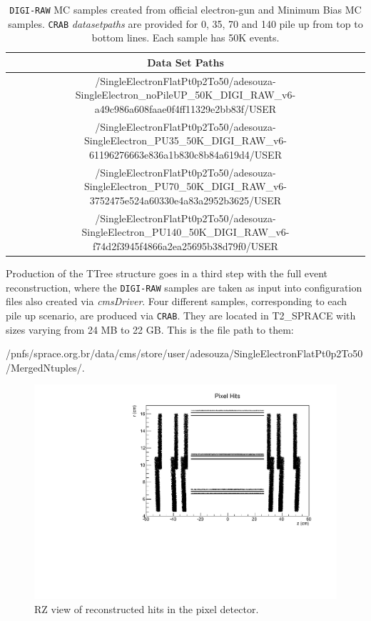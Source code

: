 \begin{table}[!htb]
  \centering
  \scriptsize
  \caption{\texttt{DIGI-RAW} MC samples created from official electron-gun and Minimum Bias MC samples.
    \texttt{CRAB} {\it datasetpaths} are provided for 0, 35, 70 and 140 pile up from top to bottom lines.
    Each sample has 50K events.}
  \label{tab:digi-raw}
  \begin{tabular}{c}
    \hline
        {\bf Data Set Paths} \\ \hline \hline
        /SingleElectronFlatPt0p2To50/adesouza-SingleElectron\_noPileUP\_50K\_DIGI\_RAW\_v6-a49c986a608faae0f4ff11329e2bb83f/USER \\
        /SingleElectronFlatPt0p2To50/adesouza-SingleElectron\_PU35\_50K\_DIGI\_RAW\_v6-61196276663e836a1b830c8b84a619d4/USER \\
        /SingleElectronFlatPt0p2To50/adesouza-SingleElectron\_PU70\_50K\_DIGI\_RAW\_v6-3752475e524a60330e4a83a2952b3625/USER \\
        /SingleElectronFlatPt0p2To50/adesouza-SingleElectron\_PU140\_50K\_DIGI\_RAW\_v6-f74d2f3945f4866a2ea25695b38d79f0/USER \\ \hline
  \end{tabular}
\end{table}

Production of the TTree structure goes in a third step with the full event reconstruction, where the
\texttt{DIGI-RAW} samples are taken as input into configuration files also created via {\it cmsDriver}.
Four different samples, corresponding to each pile up scenario, are produced via \texttt{CRAB}. They are
located in T2\_SPRACE with sizes varying from 24 MB to 22 GB. This is the file path to them:

{\footnotesize /pnfs/sprace.org.br/data/cms/store/user/adesouza/SingleElectronFlatPt0p2To50/MergedNtuples/}.

\begin{figure}[!htb]
  \centering
  \includegraphics[scale=0.8]{../SimulationTools/RZ_view_pixel_hits.pdf}
  \caption{RZ view of reconstructed hits in the pixel detector.}
  \label{}
\end{figure}

